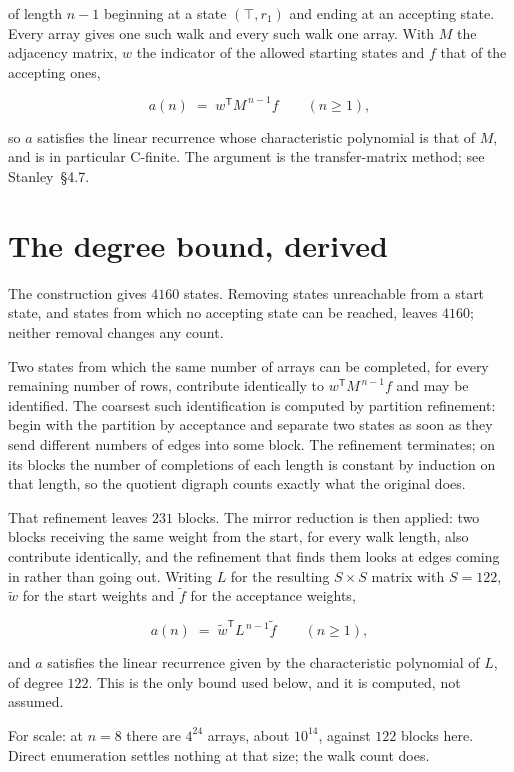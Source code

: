 \documentclass[11pt]{article}
\theoremstyle{definition}
\begin{document}
of length $n-1$ beginning at a state $(\top,r_1)$ and ending at an accepting state. Every array gives one such walk and every such walk one array. With $M$ the adjacency matrix, $w$ the indicator of the allowed starting states and $f$ that of the accepting ones,

\[a(n) \;=\; w^{\mathsf T} M^{\,n-1} f \qquad (n \ge 1),\]

so $a$ satisfies the linear recurrence whose characteristic polynomial is that of $M$, and is in particular C-finite. The argument is the transfer-matrix method; see Stanley~\S4.7.

\section{The degree bound, derived}

The construction gives $4160$ states. Removing states unreachable from a start state, and states from which no accepting state can be reached, leaves $4160$; neither removal changes any count.

Two states from which the same number of arrays can be completed, for every remaining number of rows, contribute identically to $w^{\mathsf T}M^{\,n-1}f$ and may be identified. The coarsest such identification is computed by partition refinement: begin with the partition by acceptance and separate two states as soon as they send different numbers of edges into some block. The refinement terminates; on its blocks the number of completions of each length is constant by induction on that length, so the quotient digraph counts exactly what the original does.

That refinement leaves $231$ blocks. The mirror reduction is then applied: two blocks receiving the same weight from the start, for every walk length, also contribute identically, and the refinement that finds them looks at edges coming in rather than going out. Writing $L$ for the resulting $S \times S$ matrix with $S = 122$, $\tilde w$ for the start weights and $\tilde f$ for the acceptance weights,

\[a(n) \;=\; \tilde w^{\mathsf T} L^{\,n-1} \tilde f \qquad (n \ge 1),\]

and $a$ satisfies the linear recurrence given by the characteristic polynomial of $L$, of degree $122$. This is the only bound used below, and it is computed, not assumed.

For scale: at $n = 8$ there are $4^{24}$ arrays, about $10^{14}$, against $122$ blocks here. Direct enumeration settles nothing at that size; the walk count does.
\end{document}

